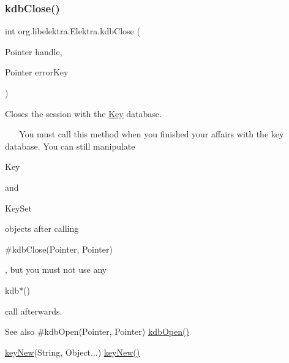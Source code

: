 \mbox{\label{interfaceorg_1_1libelektra_1_1Elektra_a60cf0c7cefd0a6a34b4608bdc5eded4b}} 
\subsubsection{\texorpdfstring{kdb\+Close()}{kdbClose()}}
{\footnotesize\ttfamily int org.\+libelektra.\+Elektra.\+kdb\+Close (\begin{DoxyParamCaption}\item[{Pointer}]{handle,  }\item[{Pointer}]{error\+Key }\end{DoxyParamCaption})}



Closes the session with the \hyperlink{classorg_1_1libelektra_1_1Key}{Key} database. 

~\newline
 ~\newline
 You must call this method when you finished your affairs with the key database. You can still manipulate 
\begin{DoxyCode}
Key 
\end{DoxyCode}
 and
\begin{DoxyCode}
KeySet 
\end{DoxyCode}
 objects after calling
\begin{DoxyCode}
\textcolor{preprocessor}{#kdbClose(Pointer, Pointer) }
\end{DoxyCode}
 , but you must not use any
\begin{DoxyCode}
kdb*() 
\end{DoxyCode}
 call afterwards.~\newline


\begin{DoxySeeAlso}{See also}
\#kdb\+Open(\+Pointer, Pointer) \hyperlink{interfaceorg_1_1libelektra_1_1Elektra_a32639cf92429fe65bf3744a007d8647f}{kdb\+Open()} 

\hyperlink{interfaceorg_1_1libelektra_1_1Elektra_ae437441010a3a634a39107e37808cbd1}{key\+New}(String, Object...) \hyperlink{interfaceorg_1_1libelektra_1_1Elektra_ae437441010a3a634a39107e37808cbd1}{key\+New()}
\end{DoxySeeAlso}

